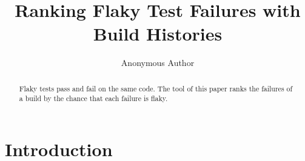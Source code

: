 \documentclass[sigconf,review,anonymous]{acmart}
\begin{document}
\title{Ranking Flaky Test Failures with Build Histories}
\author{Anonymous Author}
\begin{abstract}
Flaky tests pass and fail on the same code. The tool of this paper ranks the failures of a build by the chance that
each failure is flaky.
\end{abstract}
\maketitle
\section{Introduction}
\lipsum[1-4]
\end{document}
